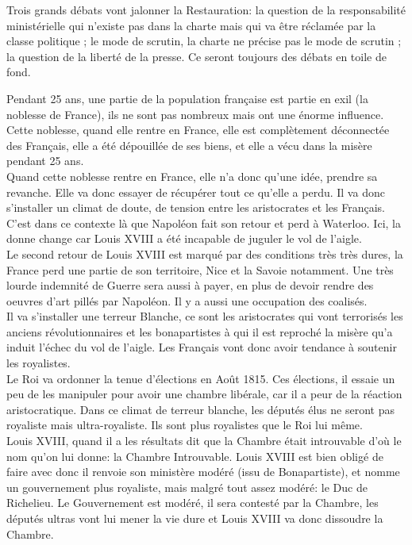 \documentclass[10pt, a4paper, openany]{book}
\begin{document}
Trois grands débats vont jalonner la Restauration: la question de la responsabilité ministérielle qui n'existe pas dans la charte mais qui va être réclamée par la classe politique ; le mode de scrutin, la charte ne précise pas le mode de scrutin ; la question de la liberté de la presse. Ce seront toujours des débats en toile de fond. 


Pendant 25 ans, une partie de la population française est partie en exil (la noblesse de France), ils ne sont pas nombreux mais ont une énorme influence. Cette noblesse, quand elle rentre en France, elle est complètement déconnectée des Français, elle a été dépouillée de ses biens, et elle a vécu dans la misère pendant 25 ans. \\
Quand cette noblesse rentre en France, elle n'a donc qu'une idée, prendre sa revanche. Elle va donc essayer de récupérer tout ce qu'elle a perdu. Il va donc s'installer un climat de doute, de tension entre les aristocrates et les Français. C'est dans ce contexte là que Napoléon fait son retour et perd à Waterloo. Ici, la donne change car Louis XVIII a été incapable de juguler le vol de l'aigle. \\
Le second retour de Louis XVIII est marqué par des conditions très très dures, la France perd une partie de son territoire, Nice et la Savoie notamment. Une très lourde indemnité de Guerre sera aussi à payer, en plus de devoir rendre des oeuvres d'art pillés par Napoléon. Il y a aussi une occupation des coalisés. \\
Il va s'installer une terreur Blanche, ce sont les aristocrates qui vont terrorisés les anciens révolutionnaires et les bonapartistes à qui il est reproché la misère qu'a induit l'échec du vol de l'aigle. Les Français vont donc avoir tendance à soutenir les royalistes. \\
Le Roi va ordonner la tenue d'élections en Août 1815. Ces élections, il essaie un peu de les manipuler pour avoir une chambre libérale, car il a peur de la réaction aristocratique. Dans ce climat de terreur blanche, les députés élus ne seront pas royaliste mais ultra-royaliste. Ils sont plus royalistes que le Roi lui même. \\
Louis XVIII, quand il a les résultats dit que la Chambre était introuvable d'où le nom qu'on lui donne: la Chambre Introuvable. Louis XVIII est bien obligé de faire avec donc il renvoie son ministère modéré (issu de Bonapartiste), et nomme un gouvernement plus royaliste, mais malgré tout assez modéré: le Duc de Richelieu. Le Gouvernement est modéré, il sera contesté par la Chambre, les députés ultras vont lui mener la vie dure et Louis XVIII va donc dissoudre la Chambre.
\end{document}
